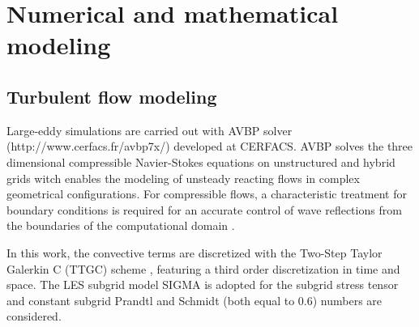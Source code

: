 \documentclass[twocolumn,10pt]{asme2e}
\begin{document}




\section*{Numerical and mathematical modeling}

\setlength{\belowdisplayskip}{0pt} \setlength{\belowdisplayshortskip}{10 pt}
\setlength{\abovedisplayskip}{0pt} \setlength{\abovedisplayshortskip}{5 pt}

\subsection*{Turbulent flow modeling}
Large-eddy simulations are carried out with AVBP solver (http://www.cerfacs.fr/avbp7x/) developed at CERFACS. AVBP solves the three dimensional compressible Navier-Stokes equations on unstructured and hybrid grids witch enables the modeling of unsteady reacting flows in complex geometrical configurations.
For compressible flows, a characteristic treatment for boundary conditions is required for an accurate control of wave reflections from the boundaries of the computational domain \cite{poinsot1992boundary}. 

In this work, the convective terms are discretized with the Two-Step Taylor Galerkin C (TTGC) scheme \cite{colin2000development}, featuring a third order discretization in time and space. The LES subgrid model SIGMA \cite{nicoud2011using} is adopted for the subgrid stress tensor and constant subgrid Prandtl and Schmidt (both equal to 0.6) numbers are considered.
\end{document}

